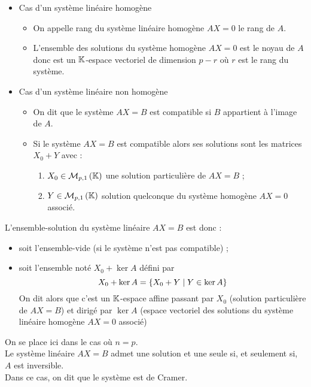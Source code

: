 \begin{defprop}
    \begin{itemize}
        \item Cas d’un système linéaire homogène
        \begin{itemize}
            \item On appelle rang du système linéaire homogène \(AX = 0\) le rang de \(A\).
            \item L’ensemble des solutions du système homogène \(AX = 0\) est le noyau de \(A\) donc est un \(\mathbb{K}\)-espace vectoriel de dimension \(p - r\) où \(r\) est le rang du système.
        \end{itemize}
        \item Cas d’un système linéaire non homogène
        \begin{itemize}
            \item On dit que le système \(AX = B\) est compatible si \(B\) appartient à l’image de \(A\).
            \item Si le système \(AX = B\) est compatible alors ses solutions sont les matrices \(X_0 + Y\) avec :
            \begin{enumerate}
                \item \(X_0 \in \M{p,1}\) une solution particulière de \(AX = B\) ;
                \item \(Y \in \M{p,1}\) solution quelconque du système homogène \(AX = 0\) associé.
            \end{enumerate}
        \end{itemize}
    \end{itemize}
    L’ensemble-solution du système linéaire \(AX = B\) est donc :
    \begin{itemize}
        \item soit l’ensemble-vide (si le système n’est pas compatible) ;
        \item soit l’ensemble noté \(X_0 + \ker A\) défini par
            \[X_0 + \ker A = \left\lbrace X_0 + Y\;\middle|\; Y \in \ker A\right\rbrace\]
        On dit alors que c’est un \(\mathbb{K}\)-espace affine passant par \(X_0\) (solution particulière de \(AX = B\)) et dirigé par \(\ker A\) (espace vectoriel des solutions du système linéaire homogène \(AX = 0\) associé)
    \end{itemize}
\end{defprop}

\begin{defprop}
    On se place ici dans le cas où \(n = p\).\\
    Le système linéaire \(AX = B\) admet une solution et une seule si, et seulement si, \(A\) est inversible. \\
    Dans ce cas, on dit que le système est de Cramer.
\end{defprop}

